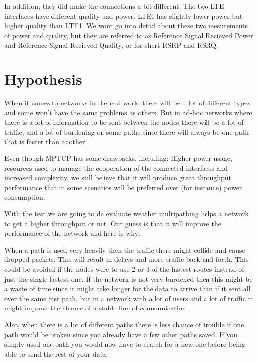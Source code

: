 \documentclass[11pt,twocolumn]{article}
\begin{document}
In addition, they did make the connections a bit different. The two LTE interfaces have different quality and power. LTE0 has slightly lower power but higher quality than LTE1. We wont go into detail about these two mesurements of power and quality, but they are referred to as Reference Signal Recieved Power and Reference Signal Recieved Quality, or for short RSRP and RSRQ.


\section{Hypothesis}

When it comes to networks in the real world there will be a lot of different types and some won't have the same problems as others. But in ad-hoc networks where there is a lot of information to be sent between the nodes there will be a lot of traffic, and a lot of burdening on some paths since there will always be one path that is faster than another.

Even though MPTCP has some drawbacks, including: Higher power usage, resources used to manage the cooperation of the connected interfaces and increased complexity, we still believe that it will produce great throughput performance that in some scenarios will be preferred over (for instance) power consumption.

With the test we are going to do evaluate weather multipathing helps a network to get a higher throughput or not. Our guess is that it will improve the performance of the network and here is why:

When a path is used very heavily then the traffic there might collide and cause dropped packets. This will result in delays and more traffic back and forth. This could be avoided if the nodes were to use 2 or 3 of the fastest routes instead of just the single fastest one. If the network is not very burdened then this might be a waste of time since it might take longer for the data to arrive than if it sent all over the same fast path, but in a network with a lot of users and a lot of traffic it might improve the chance of a stable line of communication.

Also, when there is a lot of different paths there is less chance of trouble if one path would be broken since you already have a few other paths saved. If you simply used one path you would now have to search for a new one before being able to send the rest of your data.
\end{document}
